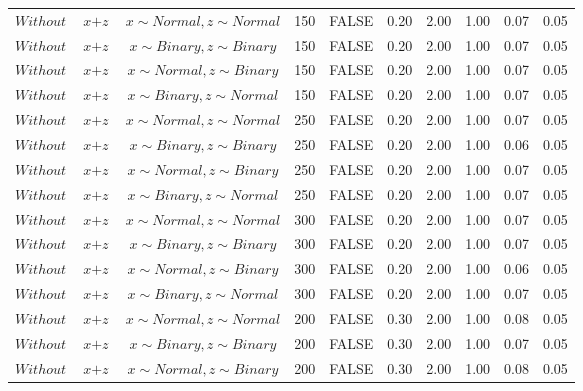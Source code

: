 \begin{longtable}{lccccccccc}
  $Without$ & $\textit{x} + \textit{z}$ & $\textit{x} \sim Normal , \textit{z} \sim Normal$ & 150 & FALSE & 0.20 & 2.00 & 1.00 & 0.07 & 0.05 \\ 
  $Without$ & $\textit{x} + \textit{z}$ & $\textit{x} \sim Binary, \textit{z} \sim Binary$ & 150 & FALSE & 0.20 & 2.00 & 1.00 & 0.07 & 0.05 \\ 
  $Without$ & $\textit{x} + \textit{z}$ & $\textit{x} \sim Normal, \textit{z} \sim Binary$ & 150 & FALSE & 0.20 & 2.00 & 1.00 & 0.07 & 0.05 \\ 
  $Without$ & $\textit{x} + \textit{z}$ & $\textit{x} \sim Binary, \textit{z} \sim Normal$ & 150 & FALSE & 0.20 & 2.00 & 1.00 & 0.07 & 0.05 \\ 
  $Without$ & $\textit{x} + \textit{z}$ & $\textit{x} \sim Normal , \textit{z} \sim Normal$ & 250 & FALSE & 0.20 & 2.00 & 1.00 & 0.07 & 0.05 \\ 
  $Without$ & $\textit{x} + \textit{z}$ & $\textit{x} \sim Binary, \textit{z} \sim Binary$ & 250 & FALSE & 0.20 & 2.00 & 1.00 & 0.06 & 0.05 \\ 
  $Without$ & $\textit{x} + \textit{z}$ & $\textit{x} \sim Normal, \textit{z} \sim Binary$ & 250 & FALSE & 0.20 & 2.00 & 1.00 & 0.07 & 0.05 \\ 
  $Without$ & $\textit{x} + \textit{z}$ & $\textit{x} \sim Binary, \textit{z} \sim Normal$ & 250 & FALSE & 0.20 & 2.00 & 1.00 & 0.07 & 0.05 \\ 
  $Without$ & $\textit{x} + \textit{z}$ & $\textit{x} \sim Normal , \textit{z} \sim Normal$ & 300 & FALSE & 0.20 & 2.00 & 1.00 & 0.07 & 0.05 \\ 
  $Without$ & $\textit{x} + \textit{z}$ & $\textit{x} \sim Binary, \textit{z} \sim Binary$ & 300 & FALSE & 0.20 & 2.00 & 1.00 & 0.07 & 0.05 \\ 
  $Without$ & $\textit{x} + \textit{z}$ & $\textit{x} \sim Normal, \textit{z} \sim Binary$ & 300 & FALSE & 0.20 & 2.00 & 1.00 & 0.06 & 0.05 \\ 
  $Without$ & $\textit{x} + \textit{z}$ & $\textit{x} \sim Binary, \textit{z} \sim Normal$ & 300 & FALSE & 0.20 & 2.00 & 1.00 & 0.07 & 0.05 \\ 
  $Without$ & $\textit{x} + \textit{z}$ & $\textit{x} \sim Normal , \textit{z} \sim Normal$ & 200 & FALSE & 0.30 & 2.00 & 1.00 & 0.08 & 0.05 \\ 
  $Without$ & $\textit{x} + \textit{z}$ & $\textit{x} \sim Binary, \textit{z} \sim Binary$ & 200 & FALSE & 0.30 & 2.00 & 1.00 & 0.07 & 0.05 \\ 
  $Without$ & $\textit{x} + \textit{z}$ & $\textit{x} \sim Normal, \textit{z} \sim Binary$ & 200 & FALSE & 0.30 & 2.00 & 1.00 & 0.08 & 0.05 \\ 

\end{longtable}
